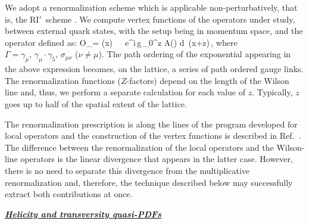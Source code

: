 \medskip
We adopt a renormalization scheme which is applicable non-perturbatively, that is, the RI$'$~scheme \cite{Martinelli:1994ty}.
We compute vertex functions of the operators under study, between external quark states, with the setup being in momentum
space, and the operator defined as:
\be
{\cal O}_\Gamma = \overline \psi(x) \, \Gamma \,\, e^{i\,g\,\int_{0}^{z} A(\zeta) d\zeta}\, \psi(x+z\hat{\mu})\,,
\ee
where $\Gamma=\gamma_\mu,\,\gamma_\mu\cdot\gamma_5,\,\sigma_{\mu\nu}$ ($\nu\neq\mu$). The path ordering of the exponential
appearing in the above expression becomes, on the lattice, a series of path ordered gauge links. The renormalization functions
($Z$-factors) depend on the length of the Wilson line and, thus, we perform a separate calculation for each value of $z$. Typically, $z$
goes up to half of the spatial extent of the lattice.

\medskip
The renormalization prescription is along the lines of the program developed for local operators and the construction of the vertex functions is
described in Ref.~\cite{Alexandrou:2010me}. The difference between the renormalization of the local operators and
the Wilson-line operators is the linear divergence that appears in the latter case. However, there is no need to separate this divergence
from the multiplicative renormalization and, therefore, the technique described below may successfully extract both contributions
at once.

\vspace*{0.55cm}
\centerline{\bf\underline{\textit{Helicity and transversity quasi-PDFs}}}
\vskip 0.25cm

